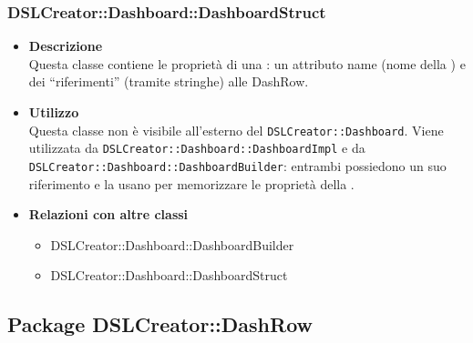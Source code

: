                 \subsubsection{DSLCreator::Dashboard::DashboardStruct}
                    \begin{itemize}
                        \item \textbf{Descrizione} \hfill \\
                            Questa classe contiene le proprietà di una : un attributo name (nome della ) e dei ``riferimenti'' (tramite stringhe) alle DashRow.
                        \item \textbf{Utilizzo} \hfill \\
                            Questa classe non è visibile all'esterno del  \texttt{DSLCreator::Dashboard}. Viene utilizzata da \texttt{DSLCreator::Dashboard::DashboardImpl} e da \texttt{DSLCreator::Dash\-board::DashboardBuilder}: entrambi possiedono un suo riferimento e la usano per memorizzare le proprietà della .
                        \item \textbf{Relazioni con altre classi}
                            \begin{itemize}
                              \item DSLCreator::Dashboard::DashboardBuilder
                              \item DSLCreator::Dashboard::DashboardStruct
                            \end{itemize}
                    \end{itemize}


        \subsection{Package DSLCreator::DashRow}

